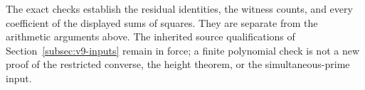 The exact checks establish the residual identities, the witness
counts, and every coefficient of the displayed sums of squares.
They are separate from the arithmetic arguments above.  The
inherited source qualifications of Section~\ref{subsec:v9-inputs}
remain in force; a finite polynomial check is not a new proof of the
restricted converse, the height theorem, or the simultaneous-prime
input.
